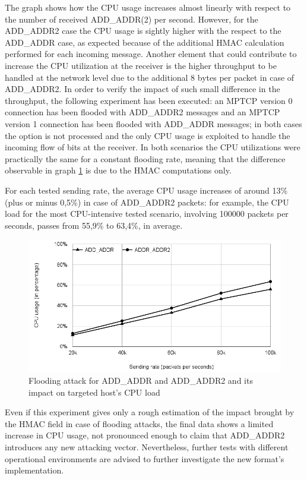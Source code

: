 The graph shows how the CPU usage increases almost linearly with respect to the number of received ADD\_ADDR(2) per second. However, for the ADD\_ADDR2 case the CPU usage is sightly higher with the respect to the ADD\_ADDR case, as expected because of the additional HMAC calculation performed for each incoming message. Another element that could contribute to increase the CPU utilization at the receiver is the higher throughput to be handled at the network level due to the additional 8 bytes per packet in case of ADD\_ADDR2. In order to verify the impact of such small difference in the throughput, the following experiment has been executed: an MPTCP version 0 connection has been flooded with ADD\_ADDR2 messages and an MPTCP version 1 connection has been flooded with ADD\_ADDR messages; in both cases the option is not processed and the only CPU usage is exploited to handle the incoming flow of bits at the receiver. In both scenarios the CPU utilizations were practically the same for a constant flooding rate, meaning that the difference observable in graph \ref{fig:floodgraph} is due to the HMAC computations only.

For each tested sending rate, the average CPU usage increases of around 13\% (plus or minus 0,5\%) in case of ADD\_ADDR2 packets: for example, the CPU load for the most CPU-intensive tested scenario, involving 100000 packets per seconds, passes from 55,9\% to 63,4\%, in average.

\begin{figure}[!htb]
\centering
\includegraphics[width=\textwidth]{images/flood}
\caption{Flooding attack for ADD\_ADDR and ADD\_ADDR2 and its impact on targeted host's CPU load}
\label{fig:floodgraph}
\end{figure}

Even if this experiment gives only a rough estimation of the impact brought by the HMAC field in case of flooding attacks, the final data shows a limited increase in CPU usage, not pronounced enough to claim that ADD\_ADDR2 introduces any new attacking vector. Nevertheless, further tests with different operational environments are advised to further investigate the new format's implementation.
